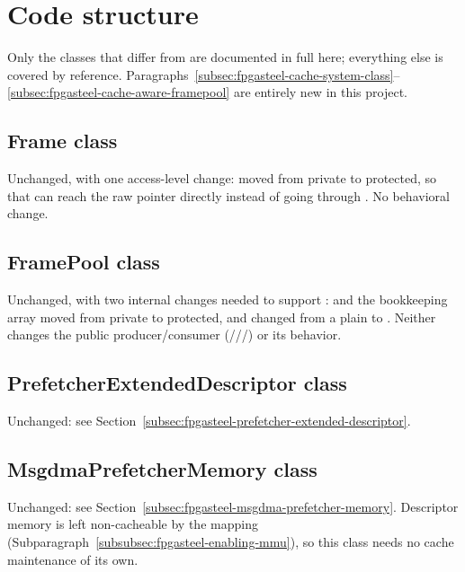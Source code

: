 \section{Code structure}
\label{sec:fpgasteel-cache-code-structure}

Only the classes that differ from  are documented in full here; everything else is covered by reference. Paragraphs~\ref{subsec:fpgasteel-cache-system-class}--\ref{subsec:fpgasteel-cache-aware-framepool} are entirely new in this project.

\subsection{Frame class}
\label{subsec:fpgasteel-cache-frame-class}

Unchanged, with one access-level change:  moved from private to protected, so that  can reach the raw pointer directly instead of going through . No behavioral change.

\subsection{FramePool class}
\label{subsec:fpgasteel-cache-framepool}

Unchanged, with two internal changes needed to support :  and the  bookkeeping array moved from private to protected, and  changed from a plain  to . Neither changes the public producer/consumer  (///) or its behavior.

\subsection{PrefetcherExtendedDescriptor class}
\label{subsec:fpgasteel-cache-prefetcher-extended-descriptor}

Unchanged: see Section~\ref{subsec:fpgasteel-prefetcher-extended-descriptor}.

\subsection{MsgdmaPrefetcherMemory class}
\label{subsec:fpgasteel-cache-msgdma-prefetcher-memory}

Unchanged: see Section~\ref{subsec:fpgasteel-msgdma-prefetcher-memory}. Descriptor memory is left non-cacheable by the  mapping (Subparagraph~\ref{subsubsec:fpgasteel-enabling-mmu}), so this class needs no cache maintenance of its own.


